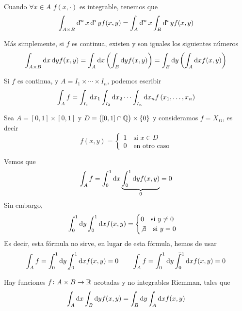 \begin{obs}
    Cuando $\forall x \in A$ $f(x, \cdot)$ es integrable, tenemos que
    \[
        \int_{A \times B} \dif^m x \dif^n y f(x, y) = \int_A \dif^m x \int_B \dif^n y
        f(x, y)
    \]
\end{obs}

\begin{obs}
	Más simplemente, si $f$ es continua, existen y son iguales los siguientes números
	\[
		\int_{A \times B} \dif x \dif y f(x, y) = \int_A \dif x \left(\int_B
		\dif y f(x, y) \right) = \int_B \dif y \left( \int_A \dif x f(x, y) \right)
	\]
\end{obs}

\begin{col}
    Si $f$ es continua, y $A = I_1 \times \cdots \times I_n$, podemos escribir
    \[
        \int_A f = \int_{I_1} \dif x_1 \int_{I_2} \dif x_2 \cdots \int_{I_n} \dif x_n
        f\left( x_1, \dots , x_n \right)
    \]
\end{col}

\begin{example*}
    Sea $A = [0,1] \times [0,1]$ y $D = \left( [0,1] \cap \mathbb{Q} \right) \times \{0\}$ y
    consideramos $f = X_D$, es decir
    \[
        f(x, y) =
        \begin{cases}
            1 \quad \text{si } x \in D \\ 0 \quad \text{en otro caso}
        \end{cases}
    \]

    Vemos que 
    \[
        \int_A f = \int^1_0 \dif x \underbrace{\int^1_0 \dif y f(x, y)}_{0} = 0
    \]
    Sin embargo,
    \[
        \int^1_0 \dif y \int^1_0 \dif x f(x, y) =
        \begin{cases}
            0 \quad \text{si } y \neq 0 \\
            \not\exists \quad \text{si } y = 0
        \end{cases}
    \]
    Es decir, esta fórmula no sirve, en lugar de esta fórmula, hemos de usar
    \[
        \int_A f = \int^1_0 \dif y \lowint^1_0 \dif x f(x, y) = 0 \qquad
        \int_A f = \int^1_0 \dif y \upint^1_0 \dif x f(x, y) = 0
    \]
\end{example*}

\begin{obs}
    Hay funciones $f \colon A \times B \to \mathbb{R}$ acotadas y no integrables Riemman,
    tales que
    \[
        \int_A \dif x \int_B \dif y f(x, y) = \int_B \dif y \int_A \dif x f(x, y)
    \]
\end{obs}

